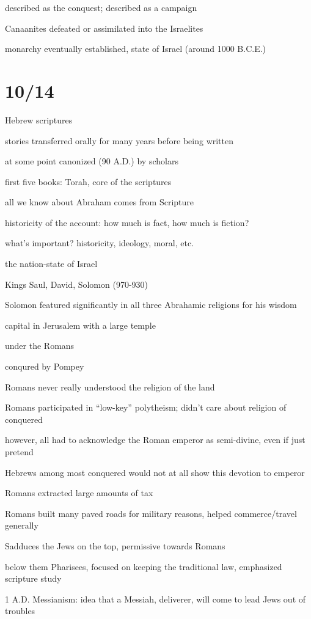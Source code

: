 \documentclass[12pt]{article}
\begin{document}
described as the conquest; described as a campaign

Canaanites defeated or assimilated into the Israelites

monarchy eventually established, state of Israel (around 1000 B.C.E.)

\section{10/14}

Hebrew scriptures

stories transferred orally for many years before being written

at some point canonized (90 A.D.) by scholars

first five books: Torah, core of the scriptures

\noindent
all we know about Abraham comes from Scripture

historicity of the account: how much is fact, how much is fiction?

what's important? historicity, ideology, moral, etc.

\noindent
the nation-state of Israel

Kings Saul, David, Solomon (970-930)

Solomon featured significantly in all three Abrahamic religions for his wisdom

capital in Jerusalem with a large temple

\noindent
under the Romans

conqured by Pompey

Romans never really understood the religion of the land

Romans participated in ``low-key'' polytheism; didn't care about religion of conquered

however, all had to acknowledge the Roman emperor as semi-divine, even if just pretend

Hebrews among most conquered would not at all show this devotion to emperor

Romans extracted large amounts of tax

Romans built many paved roads for military reasons, helped commerce/travel generally

Sadduces the Jews on the top, permissive towards Romans

below them Pharisees, focused on keeping the traditional law, emphasized scripture study

1 A.D. Messianism: idea that a Messiah, deliverer, will come to lead Jews out of troubles
\end{document}

